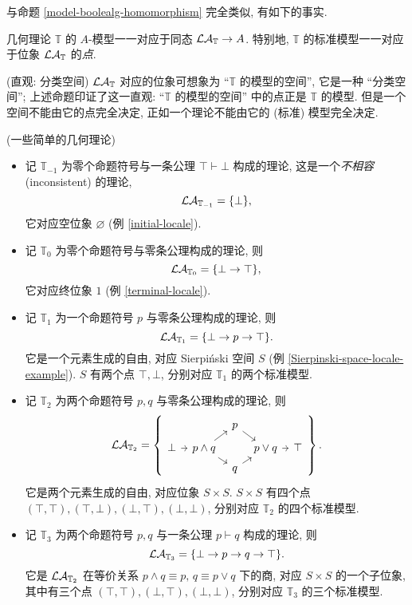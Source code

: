 与命题 \ref{model-boolealg-homomorphism} 完全类似, 有如下的事实.
\begin{prop}
	{}
	几何理论 $\mathbb T$ 的 $A$-模型一一对应于\fm{}同态 $\mathcal {LA}_{\mathbb T}\to A$. 特别地, $\mathbb T$ 的标准模型一一对应于位象 $\mathcal {LA}_{\mathbb T}$ 的\emph{点}.
\end{prop}

\begin{remark}
	[label={classifying-locale}]
	{(直观: 分类空间)}
	$\mathcal {LA}_{\mathbb T}$ 对应的位象可想象为 ``$\mathbb T$ 的模型的空间'', 它是一种 ``分类空间''; 上述命题印证了这一直观: ``$\mathbb T$ 的模型的空间'' 中的点正是 $\mathbb T$ 的模型. 但是一个空间不能由它的点完全决定, 正如一个理论不能由它的 (标准) 模型完全决定.
\end{remark}

\begin{example}
	{(一些简单的几何理论)}
	\begin{itemize}
		\item 记 $\mathbb T_{-1}$ 为零个命题符号与一条公理 $\top\vdash \bot$ 构成的理论, 这是一个\emph{不相容} (inconsistent) 的理论,
		\[
		\mathcal {LA}_{\mathbb T_{-1}} = \{\bot\},
		\]
		它对应空位象 $\varnothing$ (例 \ref{initial-locale}).
		\item 记 $\mathbb T_0$ 为零个命题符号与零条公理构成的理论, 则
		\[
		\mathcal {LA}_{\mathbb T_0} = \{\bot \to \top\},
		\]
		它对应终位象 $1$ (例 \ref{terminal-locale}).
		\item 记 $\mathbb T_1$ 为一个命题符号 $p$ 与零条公理构成的理论, 则
		\[
		\mathcal {LA}_{\mathbb T_1} =
		\{
		\bot \to p \to \top
		\}.
		\]
		它是一个元素生成的自由\fm{}, 对应 Sierpi\'nski 空间 $S$ (例 \ref{Sierpinski-space-locale-example}).
		$S$ 有两个点 $\top, \bot$, 分别对应 $\mathbb T_1$ 的两个标准模型.
		\item 记 $\mathbb T_2$ 为两个命题符号 $p,q$ 与零条公理构成的理论, 则
		\[
		\LA_{\mathbb T_2} =
		\left\{
		\begin{tikzcd}[ampersand replacement=\&,sep=tiny]
			\&\& p \\
			\bot \& {p\land q} \&\& {p\lor q} \& \top \\
			\&\& q
			\arrow[from=2-1, to=2-2]
			\arrow[from=2-2, to=1-3]
			\arrow[from=1-3, to=2-4]
			\arrow[from=2-4, to=2-5]
			\arrow[from=2-2, to=3-3]
			\arrow[from=3-3, to=2-4]
		\end{tikzcd}
		\right\}.
		\]
		它是两个元素生成的自由\fm{}, 对应位象 $S\times S$.
		$S\times S$ 有四个点 $(\top,\top), (\top,\bot), (\bot,\top), (\bot,\bot)$, 分别对应 $\mathbb T_2$ 的四个标准模型.
		\item 记 $\mathbb T_3$ 为两个命题符号 $p,q$ 与一条公理 $p\vdash q$ 构成的理论, 则
		\[
		\mathcal {LA}_{\mathbb T_3} =
		\{
		\bot \to p \to q \to \top
		\}.
		\]
		它是 $\mathcal {LA}_{\mathbb T_2}$ 在等价关系 $p\land q\equiv p,\, q\equiv p\lor q$ 下的商, 对应 $S\times S$ 的一个子位象,
		其中有三个点
		$(\top,\top), (\bot,\top), (\bot,\bot)$, 分别对应 $\mathbb T_3$ 的三个标准模型.
	\end{itemize}
\end{example}

